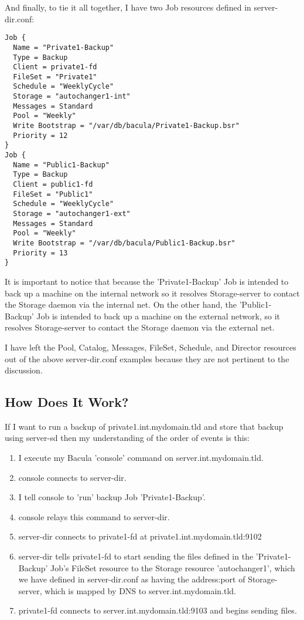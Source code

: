 And finally, to tie it all together, I have two Job resources defined in
server-dir.conf:

\footnotesize
\begin{verbatim}
Job {
  Name = "Private1-Backup"
  Type = Backup
  Client = private1-fd
  FileSet = "Private1"
  Schedule = "WeeklyCycle"
  Storage = "autochanger1-int"
  Messages = Standard
  Pool = "Weekly"
  Write Bootstrap = "/var/db/bacula/Private1-Backup.bsr"
  Priority = 12
}
Job {
  Name = "Public1-Backup"
  Type = Backup
  Client = public1-fd
  FileSet = "Public1"
  Schedule = "WeeklyCycle"
  Storage = "autochanger1-ext"
  Messages = Standard
  Pool = "Weekly"
  Write Bootstrap = "/var/db/bacula/Public1-Backup.bsr"
  Priority = 13
}
\end{verbatim}
\normalsize

It is important to notice that because the 'Private1-Backup' Job is intended
to back up a machine on the internal network so it resolves Storage-server
to contact the Storage daemon via the internal net.
On the other hand, the 'Public1-Backup' Job is intended to
back up a machine on the external network, so it resolves Storage-server
to contact the Storage daemon via the external net.

I have left the Pool, Catalog, Messages, FileSet, Schedule, and Director
resources out of the above server-dir.conf examples because they are not
pertinent to the discussion.

\subsection{How Does It Work?}

If I want to run a backup of private1.int.mydomain.tld and store that backup
using server-sd then my understanding of the order of events is this:

\begin{enumerate}
\item I execute my Bacula 'console' command on server.int.mydomain.tld.
\item console connects to server-dir.
\item I tell console to 'run' backup Job 'Private1-Backup'.
\item console relays this command to server-dir.
\item server-dir connects to private1-fd at private1.int.mydomain.tld:9102
\item server-dir tells private1-fd to start sending the files defined in  the
   'Private1-Backup' Job's FileSet resource to the Storage resource
   'autochanger1', which we have defined in server-dir.conf as having the
address:port of Storage-server, which is mapped by DNS to server.int.mydomain.tld.
\item private1-fd connects to server.int.mydomain.tld:9103 and begins sending
   files.
   \end{enumerate}

